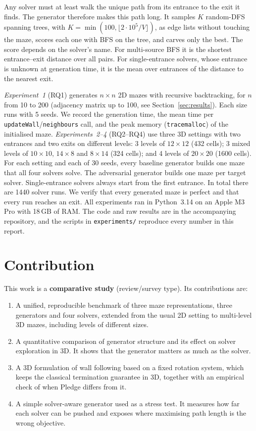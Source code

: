 Any solver must at least walk the unique path from its entrance to the exit it finds.
The generator therefore makes this path long.
It samples $K$ random-DFS spanning trees, with $K=\min(100,\lfloor 2\cdot 10^5/V\rfloor)$, as edge lists without touching the maze, scores each one with BFS on the tree, and carves only the best.
The score depends on the solver's name.
For multi-source BFS it is the shortest entrance--exit distance over all pairs.
For single-entrance solvers, whose entrance is unknown at generation time, it is the mean over entrances of the distance to the nearest exit.

\emph{Experiment~1} (RQ1) generates $n\times n$ 2D mazes with recursive backtracking, for $n$ from 10 to 200 (adjacency matrix up to 100, see Section~\ref{sec:results}).
Each size runs with 5 seeds.
We record the generation time, the mean time per \texttt{updateWall}/\texttt{neighbours} call, and the peak memory (\texttt{tracemalloc}) of the initialised maze.
\emph{Experiments~2--4} (RQ2--RQ4) use three 3D settings with two entrances and two exits on different levels:
3 levels of $12\times12$ (432 cells);
3 mixed levels of $10\times10$, $14\times8$ and $8\times14$ (324 cells);
and 4 levels of $20\times20$ (1600 cells).
For each setting and each of 30 seeds, every baseline generator builds one maze that all four solvers solve.
The adversarial generator builds one maze per target solver.
Single-entrance solvers always start from the first entrance.
In total there are 1440 solver runs.
We verify that every generated maze is perfect and that every run reaches an exit.
All experiments ran in Python~3.14 on an Apple M3 Pro with 18\,GB of RAM.
The code and raw results are in the accompanying repository, and the scripts in \texttt{experiments/} reproduce every number in this report.

\section{Contribution}
\label{sec:contribution}

This work is a \textbf{comparative study} (review/survey type).
Its contributions are:
\begin{enumerate}
  \item A unified, reproducible benchmark of three maze representations, three generators and four solvers, extended from the usual 2D setting to multi-level 3D mazes, including levels of different sizes.
  \item A quantitative comparison of generator structure and its effect on solver exploration in 3D.
  It shows that the generator matters as much as the solver.
  \item A 3D formulation of wall following based on a fixed rotation system, which keeps the classical termination guarantee in 3D, together with an empirical check of when Pledge differs from it.
  \item A simple solver-aware generator used as a stress test.
  It measures how far each solver can be pushed and exposes where maximising path length is the wrong objective.
\end{enumerate}

